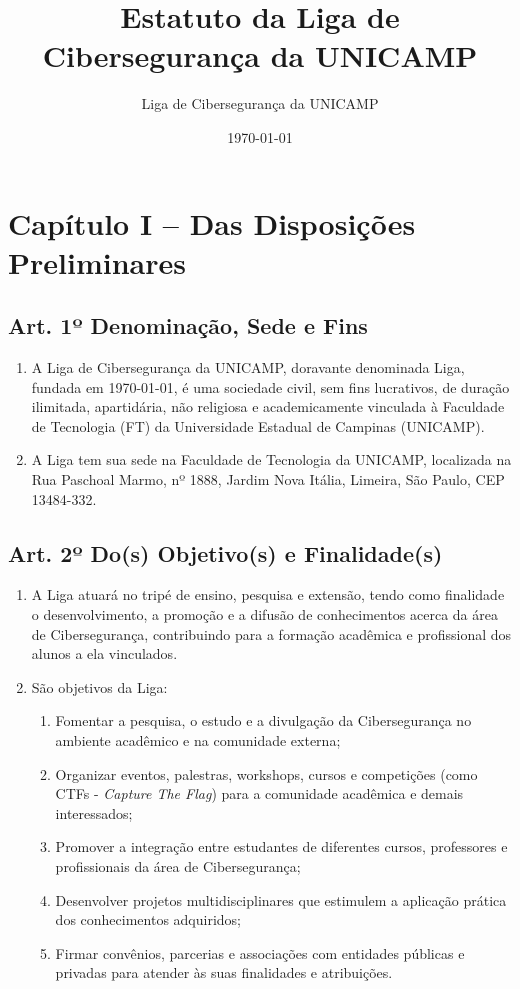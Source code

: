 \documentclass[12pt, a4paper]{article}
\title{Estatuto da Liga de Cibersegurança da UNICAMP}
\author{Liga de Cibersegurança da UNICAMP}
\date{\today} %
\begin{document}
\maketitle
\thispagestyle{empty}
\newpage

\tableofcontents
\newpage


\section{Capítulo I – Das Disposições Preliminares}


\subsection{Art. 1º Denominação, Sede e Fins}
\begin{enumerate}[label=\S \arabic*.]
    \item A Liga de Cibersegurança da UNICAMP, doravante denominada Liga, fundada em \today, é uma sociedade civil, sem fins lucrativos, de duração ilimitada, apartidária, não religiosa e academicamente vinculada à Faculdade de Tecnologia (FT) da Universidade Estadual de Campinas (UNICAMP).
    \item A Liga tem sua sede na Faculdade de Tecnologia da UNICAMP, localizada na Rua Paschoal Marmo, nº 1888, Jardim Nova Itália, Limeira, São Paulo, CEP 13484-332.
\end{enumerate}

\subsection{Art. 2º Do(s) Objetivo(s) e Finalidade(s)}
\begin{enumerate}[label=\S \arabic*.]
    \item A Liga atuará no tripé de ensino, pesquisa e extensão, tendo como finalidade o desenvolvimento, a promoção e a difusão de conhecimentos acerca da área de Cibersegurança, contribuindo para a formação acadêmica e profissional dos alunos a ela vinculados.
    \item São objetivos da Liga:
    \begin{enumerate}[label=\alph*)]
        \item Fomentar a pesquisa, o estudo e a divulgação da Cibersegurança no ambiente acadêmico e na comunidade externa;
        \item Organizar eventos, palestras, workshops, cursos e competições (como CTFs - \textit{Capture The Flag}) para a comunidade acadêmica e demais interessados;
        \item Promover a integração entre estudantes de diferentes cursos, professores e profissionais da área de Cibersegurança;
        \item Desenvolver projetos multidisciplinares que estimulem a aplicação prática dos conhecimentos adquiridos;
        \item Firmar convênios, parcerias e associações com entidades públicas e privadas para atender às suas finalidades e atribuições.
    \end{enumerate}
\end{enumerate}
\end{document}
